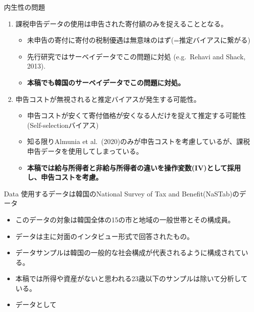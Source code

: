 \documentclass[dvipdfmx,10pt]{beamer}
\begin{document}
	\begin{frame}{内生性の問題}
		\begin{enumerate}
			\item 課税申告データの使用は申告された寄付額のみを捉えることとなる。
			\begin{itemize}
				\item 未申告の寄付に寄付の税制優遇は無意味のはず(=推定バイアスに繋がる)
				\item 先行研究ではサーベイデータでこの問題に対処 (e.g.~Rehavi and Shack, 2013).
				\item \textbf{本稿でも韓国のサーベイデータでこの問題に対処。}
			\end{itemize}
			\item 申告コストが無視されると推定バイアスが発生する可能性。
			\begin{itemize}
				\item 申告コストが安くて寄付価格が安くなる人だけを捉えて推定する可能性(Self-selectionバイアス)
				\item 知る限りAlmunia et al.~(2020)のみが申告コストを考慮しているが、課税申告データを使用してしまっている。
				\item\textbf{本稿では給与所得者と非給与所得者の違いを操作変数(IV)として採用し、申告コストを考慮。}
			\end{itemize}
		\end{enumerate}
	\end{frame}
	
	\begin{frame}{Data}
		使用するデータは韓国のNational Survey of Tax and Benefit(NaSTab)のデータ
		\begin{itemize}
			\item このデータの対象は韓国全体の15の市と地域の一般世帯とその構成員。
			\item データは主に対面のインタビュー形式で回答されたもの。
			\item データサンプルは韓国の一般的な社会構成が代表されるように構成されている。
			\item 本稿では所得や資産がないと思われる23歳以下のサンプルは除いて分析している。
			\item データとして
		\end{itemize}
	\end{frame}
\end{document}
